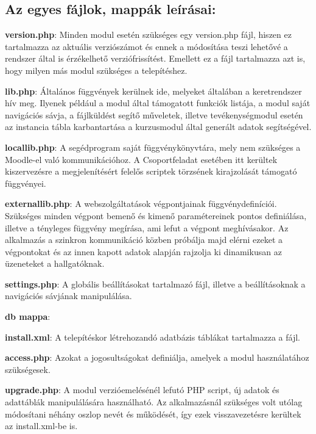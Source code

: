 \subsection{Az egyes fájlok, mappák leírásai:}
\begin{compactitem}
    \item \textbf{version.php}: Minden modul esetén szükséges egy version.php fájl, hiszen ez tartalmazza az aktuális verziószámot és ennek a módosítása teszi lehetővé a rendszer által is érzékelhető verziófrissítést. Emellett ez a fájl tartalmazza azt is, hogy milyen más modul szükséges a telepítéshez. 
    \item \textbf{lib.php}: Általános függvények kerülnek ide, melyeket általában a keretrendszer hív meg. Ilyenek például a modul által támogatott funkciók listája, a modul saját navigációs sávja, a fájlküldést segítő műveletek, illetve tevékenységmodul esetén az instancia tábla karbantartása a kurzusmodul által generált adatok segítségével. 
    \item \textbf{locallib.php}: A segédprogram saját függvénykönyvtára, mely nem szükséges a Moodle-el való kommunikációhoz. A Csoportfeladat esetében itt kerültek kiszervezésre a megjelenítésért felelős scriptek törzsének kirajzolását támogató függvényei.
    \item \textbf{externallib.php}: A webszolgáltatások végpontjainak függvénydefiníciói. Szükséges minden végpont bemenő és kimenő paramétereinek pontos definiálása, illetve a tényleges függvény megírása, ami lefut a végpont meghívásakor. Az alkalmazás a szinkron kommunikáció közben próbálja majd elérni ezeket a végpontokat és az innen kapott adatok alapján rajzolja ki dinamikusan az üzeneteket a hallgatóknak.
    \item \textbf{settings.php}: A globális beállításokat tartalmazó fájl, illetve a beállításoknak a navigációs sávjának manipulálása.
    \item \textbf{db mappa}:
    \begin{compactitem}
        \item \textbf{install.xml}: A telepítéskor létrehozandó adatbázis táblákat tartalmazza a fájl.
        \item \textbf{access.php}: Azokat a jogosultságokat definiálja, amelyek a modul használatához szükségesek.
        \item \textbf{upgrade.php}: A modul verzióemelésénél lefutó PHP script, új adatok és adattáblák manipulálására használható. Az alkalmazásnál szükséges volt utólag módosítani néhány oszlop nevét és működését, így ezek visszavezetésre kerültek az install.xml-be is.

\end{compactitem}
\end{compactitem}
